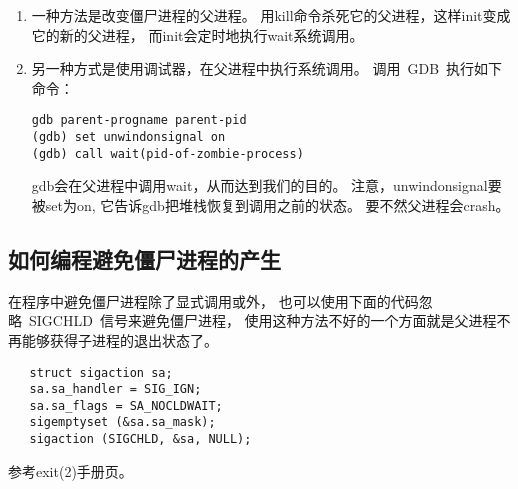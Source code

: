 \begin{enumerate}
\item 一种方法是改变僵尸进程的父进程。
用kill命令杀死它的父进程，这样init变成它的新的父进程，
而init会定时地执行wait系统调用。

\item 另一种方式是使用调试器，在父进程中执行系统调用。
调用~GDB~执行如下命令： 
\begin{lstlisting}
gdb parent-progname parent-pid
(gdb) set unwindonsignal on 
(gdb) call wait(pid-of-zombie-process) 
\end{lstlisting}

gdb会在父进程中调用wait，从而达到我们的目的。
注意，unwindonsignal要被set为on, 
它告诉gdb把堆栈恢复到调用之前的状态。
要不然父进程会crash。 

\end{enumerate}

\subsection{如何编程避免僵尸进程的产生}
在程序中避免僵尸进程除了显式调用或外，
也可以使用下面的代码忽略~SIGCHLD~信号来避免僵尸进程，
使用这种方法不好的一个方面就是父进程不再能够获得子进程的退出状态了。

\begin{lstlisting}
   struct sigaction sa; 
   sa.sa_handler = SIG_IGN; 
   sa.sa_flags = SA_NOCLDWAIT; 
   sigemptyset (&sa.sa_mask); 
   sigaction (SIGCHLD, &sa, NULL); 
\end{lstlisting}

参考exit(2)手册页。 
